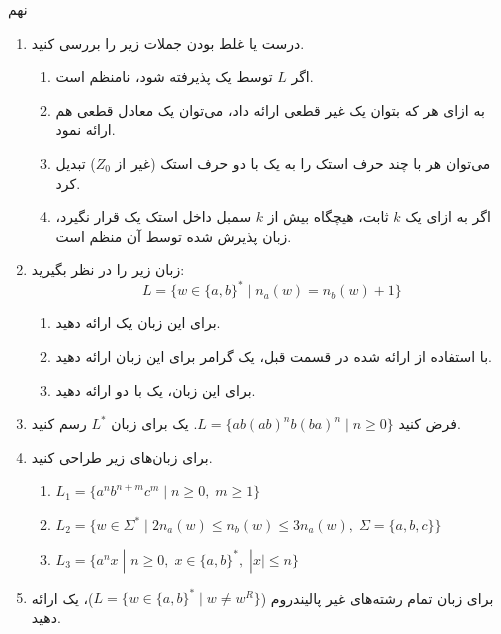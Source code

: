 
	
	\MakeTitle
	{نهم}
	{}
	\begin{enumerate}
		\item 
		درست یا غلط بودن جملات زیر را بررسی کنید.
		\begin{enumerate}
			\item 
			اگر $L$ توسط یک  پذیرفته شود، نامنظم است.
			\item 
			به ازای هر  که بتوان یک  غیر قطعی ارائه داد، می‌توان یک معادل قطعی هم ارائه نمود.
			\item
			می‌توان هر  با چند حرف استک را به یک  با دو حرف استک (غیر از $Z_0$) تبدیل کرد.
			\item 
			اگر به ازای یک $k$ ثابت، هیچگاه بیش از $k$ سمبل داخل استک یک  قرار نگیرد، زبان پذیرش شده توسط آن  منظم است.
		\end{enumerate}
		 
		\item 
	زبان زیر را در نظر بگیرید: 
		$$L = \{w \in \{a, b\}^* \;|\; n_a(w)=n_b(w)+1\}$$
		\begin{enumerate}
			\item 
			برای این زبان یک  ارائه دهید.
			\item 
			با استفاده از  ارائه شده در قسمت قبل، یک گرامر برای این زبان ارائه دهید.
			\item 
			برای این زبان، یک  با دو  ارائه دهید.
		\end{enumerate}
	
		\item 
		
		فرض کنید 
		$L = \{ab(ab)^nb(ba)^n\;|\;n\geq0\}$.
		یک  برای زبان $L^*$ رسم کنید.
		
		\item 
		برای زبان‌های زیر  طراحی کنید.
		\begin{enumerate}
			\item $L_1 = \{a^nb^{n+m}c^m \;|\; n \geq 0, \; m \geq1\}$
			\item $L_2 = \{w \in \Sigma^* \;|\; 2n_a(w) \leq n_b(w)\leq 3n_a(w), \; \Sigma=\{a,b,c\}\}$
			\item $L_3 = \{a^nx \;|\; n \geq 0, \; x \in \{a,b\}^*, \; |x|\leq n\}$
		\end{enumerate}
	
		\item 
		برای زبان تمام رشته‌های غیر پالیندروم ($L = \{w \in \{a, b\}^* \; | \; w \neq w^R\}$)، یک  ارائه دهید.
		

\end{enumerate}
